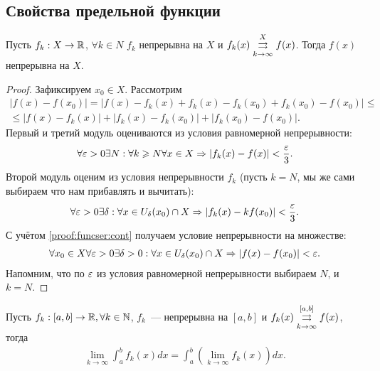 \documentclass[../main.tex]{subfiles}
\begin{document}
 \subsection{Свойства предельной функции}

 
 \begin{proposition}
   Пусть $ f_k: X \to \R$, $ \forall k \in N$ $ f_k $ непрерывна на $ X$ и $ f_k(x) \convergesuniformly{k \to \infty}{X} f(x) $. Тогда $ f(x)$ непрерывна на $ X$. 
 \end{proposition}

 
 \begin{proof}
   Зафиксируем $ x_0 \in X$. Рассмотрим 
   \begin{multline} \label{proof:funcser:cont}
     \left| f(x) - f(x_0 ) \right| = \left| f(x) - f_k(x)  + f_k(x) - f_k (x_0 ) + f_k (x_0 ) - f(x_0) \right| \leq \\ \leq \left| f(x) - f_k(x) \right| + \left| f_k(x) - f_k (x_0 ) \right| + \left| f_k (x_0 ) - f(x_0) \right|   .
   \end{multline}
   Первый и третий модуль оцениваются из условия равномерной непрерывности: 
   \begin{gather} 
     \forall \eps > 0 \exists N: \forall k \geq N \forall x \in X \hence \left| f_k(x)  - f(x)  \right| < \frac{\eps}{3}.
   \end{gather}
   Второй модуль оценим из условия непрерывности $ f_k $ (пусть $ k = N$, мы же сами выбираем что нам прибавлять и вычитать): 
   \begin{gather} 
     \forall \eps > 0 \exists \delta: \forall x \in U_{\delta}(x_0 ) \cap X \hence \left| f_k(x) - kf(x_0 ) \right| < \frac{\eps}{3} .
   \end{gather}
   С учётом \eqref{proof:funcser:cont} получаем условие непрерывности на множестве: 
   \begin{gather} 
    \forall x_0 \in X \forall \eps > 0 \exists \delta > 0 : \forall x \in U_{\delta}(x_0) \cap X \hence \left| f(x) - f(x_0) \right| < \eps .
   \end{gather}
   Напомним, что по $ \eps$ из условия равномерной непрерывности выбираем $ N$, и $ k = N$.
 \end{proof}
 
 
 \begin{proposition}
   Пусть $ f_k : [a, b ] \to \R, \forall k\in \N$, $ f_k $~--- непрерывна на $ [a,b]$ и $ f_k(x) \convergesuniformly{k \to \infty}{[a,b]} f(x)$, тогда 
   \begin{gather} 
     \lim_{k \to \infty} \int_{a}^{b} f_k(x) dx = \int_{a}^{b} \left(  \lim_{k \to \infty} f_k(x)  \right) dx.
   \end{gather}    
 \end{proposition}
 
\end{document}
